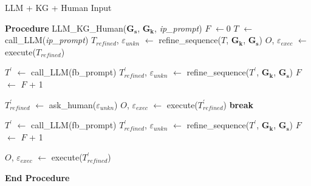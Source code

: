 \begin{algorithm}[tb]
\caption{LLM + KG + Human Input}
\label{alg:algorithm}
\begin{algorithmic}[1]
\State \textbf{Procedure} LLM\_KG\_Human($\mathbf{G_{s}}$, $\mathbf{G_{k}}$, \textit{ip\_prompt})
    \State $F$ $\leftarrow 0$                     
    \State $T$ $\leftarrow$ call\_LLM(\textit{ip\_prompt}) 
    \State $T_{refined}$, $\varepsilon_{unkn}$ $\leftarrow$ refine\_sequence($T$, $\mathbf{G_{k}}$, $\mathbf{G_{s}}$)
                    
        \State $O$, $\varepsilon_{exec}$ $\leftarrow$ execute($T_{refined}$) 
        \null\hfill{}
    \EndIf

        
            \State $T^{'}$ $\leftarrow$ call\_LLM(fb\_prompt) 
            \State $T^{'}_{refined}$, $\varepsilon_{unkn}$ $\leftarrow$ refine\_sequence($T^{'}$, $\mathbf{G_{k}}$, $\mathbf{G_{s}}$)
            \State $F$ $\leftarrow$ $F$ + 1
        \EndWhile

            \State $T^{'}_{refined}$ $\leftarrow$ ask\_human($\varepsilon_{unkn}$) 
            \State $O$, $\varepsilon_{exec}$ $\leftarrow$ execute($T^{'}_{refined}$)
            \State \textbf{break}
        \EndIf

            \State $T^{'}$ $\leftarrow$ call\_LLM(fb\_prompt)
            \State $T^{'}_{refined}$, $\varepsilon_{unkn}$ $\leftarrow$ refine\_sequence($T^{'}$, $\mathbf{G_{k}}$, $\mathbf{G_{s}}$)
            \State $F$ $\leftarrow$ $F$ + 1
        \EndIf

            \State $O$, $\varepsilon_{exec}$ $\leftarrow$ execute($T^{'}_{refined}$)
        \EndIf
    \EndWhile


\State \textbf{End Procedure}

\end{algorithmic}
\end{algorithm}

